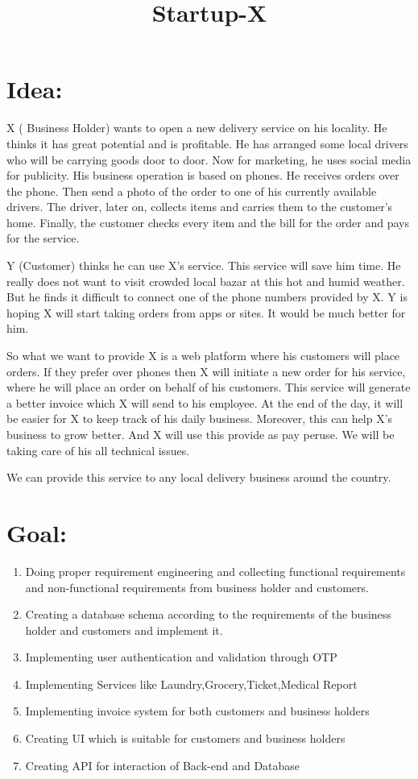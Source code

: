 \documentclass[13pt]{extarticle}
\title{Startup-X}
\date{}
\begin{document}
\tableofcontents

\newpage
\maketitle{}
\section{\textbf{Idea:} }

\quad X ( Business Holder) wants to open a new delivery service on his locality. He thinks it has great potential and is profitable. He has arranged some local drivers who will be carrying goods door to door. Now for marketing, he uses social media for publicity. His business operation is based on phones. He receives orders over the phone. Then send a photo of the order to one of his currently available drivers. The driver, later on, collects items and carries them to the customer’s home. Finally, the customer checks every item and the bill for the order and pays for the service. 

Y (Customer) thinks he can use X’s service. This service will save him time. He really does not want to visit crowded local bazar at this hot and humid weather. But he finds it difficult to connect one of the phone numbers provided by X. Y is hoping X will start taking orders from apps or sites. It would be much better for him. 

 So what we want to provide X is a web platform where his customers will place orders. If they prefer over phones then X will initiate a new order for his service, where he will place an order on behalf of his customers. This service will generate a better invoice which X will send to his employee. At the end of the day, it will be easier for X to keep track of his daily business. Moreover, this can help X’s business to grow better. And X will use this provide as pay peruse. We will be taking care of his all technical issues. 

We can provide this service to any local delivery business around the country.
\newpage
\section{\textbf{Goal:}}
\begin{enumerate}
  \item Doing proper requirement engineering and collecting functional requirements and non-functional requirements from business holder and customers.
  \item Creating a database schema according to the requirements of the business holder and customers and implement it.
  \item Implementing user authentication and validation through OTP
  \item Implementing Services like Laundry,Grocery,Ticket,Medical Report
  \item Implementing invoice system for both customers and business holders
  \item Creating UI which is suitable for customers and business holders
  \item Creating API for interaction of Back-end and Database
\end{enumerate}
\newpage
\end{document}
